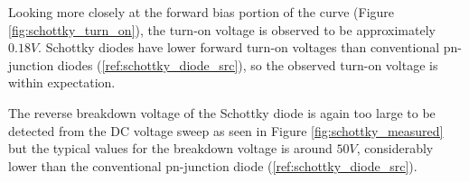 \FloatBarrier

Looking more closely at the forward bias portion of the curve (Figure \ref{fig:schottky_turn_on}), the turn-on voltage is observed to be approximately $0.18 V$. Schottky diodes have lower forward turn-on voltages than conventional pn-junction diodes (\ref{ref:schottky_diode_src}), so the observed turn-on voltage is within expectation.

The reverse breakdown voltage of the Schottky diode is again too large to be detected from the DC voltage sweep as seen in Figure \ref{fig:schottky_measured} but the typical values for the breakdown voltage is around $50 V$, considerably lower than the conventional pn-junction diode (\ref{ref:schottky_diode_src}).